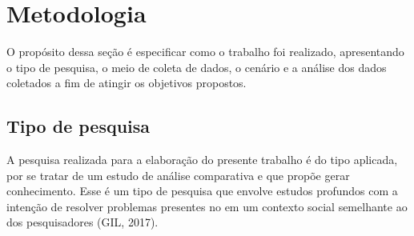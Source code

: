 \chapter{Metodologia}
\label{chap:metodologia}

O propósito dessa seção é especificar como o trabalho foi realizado, apresentando o tipo de pesquisa, o meio de coleta de dados, o cenário e a análise dos dados coletados a fim de atingir os objetivos propostos.

\section{Tipo de pesquisa}
\label{sec:tipo-de-pesquisa}

A pesquisa realizada para a elaboração do presente trabalho é do tipo aplicada, por se tratar de um estudo de análise comparativa e que propõe gerar conhecimento. Esse é um tipo de pesquisa que envolve estudos profundos com a intenção de resolver problemas presentes no em um contexto social semelhante ao dos pesquisadores (GIL, 2017)\nocite{pesquisa}.

